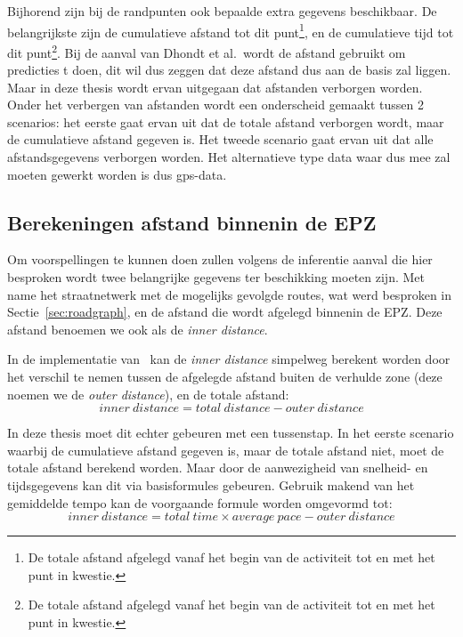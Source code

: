 Bijhorend zijn bij de randpunten ook bepaalde extra gegevens beschikbaar. De
belangrijkste zijn de cumulatieve afstand tot dit punt\footnote{De totale
    afstand afgelegd vanaf het begin van de activiteit tot en met het punt in
    kwestie.}, en de cumulatieve tijd tot dit punt\footnote{De totale afstand
    afgelegd vanaf het begin van de activiteit tot en met het punt in kwestie.}.
Bij de aanval van Dhondt et al.\ wordt de afstand gebruikt om predicties t
doen, dit wil dus zeggen dat deze afstand dus aan de basis zal liggen. Maar in
deze thesis wordt ervan uitgegaan dat afstanden verborgen worden. Onder het
verbergen van afstanden wordt een onderscheid gemaakt tussen 2 scenarios: het
eerste gaat ervan uit dat de totale afstand verborgen wordt, maar de
cumulatieve afstand gegeven is. Het tweede scenario gaat ervan uit dat alle
afstandsgegevens verborgen worden. Het alternatieve type data waar dus mee zal
moeten gewerkt worden is dus \ac{gps}-data.

\subsection{Berekeningen afstand binnenin de EPZ}\label{sec:berekeningen}
Om voorspellingen te kunnen doen zullen volgens de inferentie aanval die hier
besproken wordt twee belangrijke gegevens ter beschikking moeten zijn. Met name
het straatnetwerk met de mogelijks gevolgde routes, wat werd besproken in
Sectie~\ref{sec:roadgraph}, en de afstand die wordt afgelegd binnenin de
\ac{EPZ}. Deze afstand benoemen we ook als de \textit{inner distance}.

In de implementatie
van~\citeauthor{Dhondt_Pochat_Voulimeneas_Joosen_Volckaert_2022} kan de
\textit{inner distance} simpelweg berekent worden door het verschil te nemen
tussen de afgelegde afstand buiten de verhulde zone (deze noemen we de
\textit{outer distance}), en de totale afstand: \[inner\ distance = total\
    distance - outer\ distance \]

In deze thesis moet dit echter gebeuren met een tussenstap. In het eerste
scenario waarbij de cumulatieve afstand gegeven is, maar de totale afstand
niet, moet de totale afstand berekend worden. Maar door de aanwezigheid van
snelheid- en tijdsgegevens kan dit via basisformules gebeuren. Gebruik makend
van het gemiddelde tempo kan de voorgaande formule worden omgevormd tot: \[inner\ distance = total\ time \times average\ pace - outer\ distance \]

